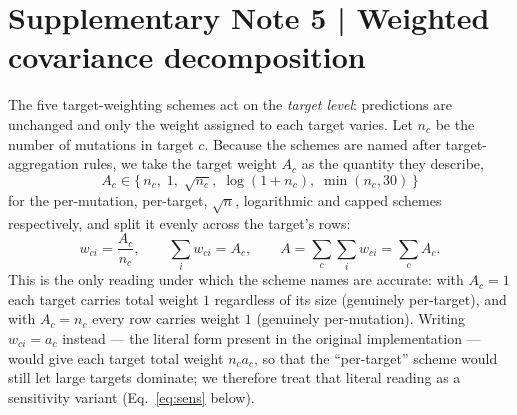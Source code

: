 \documentclass[11pt,a4paper]{article}
\begin{document}
\section*{Supplementary Note 5 | Weighted covariance decomposition}
The five target-weighting schemes act on the \emph{target level}: predictions are unchanged and
only the weight assigned to each target varies. Let $n_c$ be the number of mutations in target
$c$. Because the schemes are named after target-aggregation rules, we take the target weight
$A_c$ as the quantity they describe,
\begin{equation}
  A_c \in \{\, n_c,\; 1,\; \sqrt{n_c},\; \log(1+n_c),\; \min(n_c, 30) \,\}
  \label{eq:Ac}
\end{equation}
for the per-mutation, per-target, $\sqrt{n}$, logarithmic and capped schemes respectively, and
split it evenly across the target's rows:
\begin{equation}
  w_{ci} = \frac{A_c}{n_c}, \qquad
  \sum_{i} w_{ci} = A_c, \qquad
  A = \sum_{c}\sum_{i} w_{ci} = \sum_{c} A_c .
  \label{eq:wci}
\end{equation}
This is the only reading under which the scheme names are accurate: with $A_c = 1$ each target
carries total weight $1$ regardless of its size (genuinely per-target), and with $A_c = n_c$
every row carries weight $1$ (genuinely per-mutation). Writing $w_{ci} = a_c$ instead --- the
literal form present in the original implementation --- would give each target total weight
$n_c a_c$, so that the ``per-target'' scheme would still let large targets dominate; we
therefore treat that literal reading as a sensitivity variant
(Eq.~\eqref{eq:sens} below).
\end{document}
